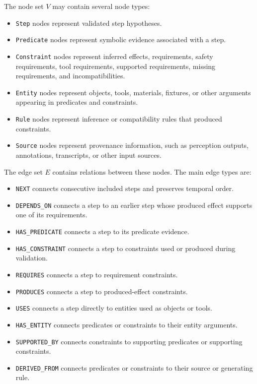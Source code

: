 The node set $V$ may contain several node types:

\begin{itemize}
    \item \texttt{Step} nodes represent validated step hypotheses.
    \item \texttt{Predicate} nodes represent symbolic evidence associated with a step.
    \item \texttt{Constraint} nodes represent inferred effects, requirements, safety requirements, tool requirements, supported requirements, missing requirements, and incompatibilities.
    \item \texttt{Entity} nodes represent objects, tools, materials, fixtures, or other arguments appearing in predicates and constraints.
    \item \texttt{Rule} nodes represent inference or compatibility rules that produced constraints.
    \item \texttt{Source} nodes represent provenance information, such as perception outputs, annotations, transcripts, or other input sources.
\end{itemize}

The edge set $E$ contains relations between these nodes. The main edge types are:

\begin{itemize}
    \item \texttt{NEXT} connects consecutive included steps and preserves temporal order.
    \item \texttt{DEPENDS\_ON} connects a step to an earlier step whose produced effect supports one of its requirements.
    \item \texttt{HAS\_PREDICATE} connects a step to its predicate evidence.
    \item \texttt{HAS\_CONSTRAINT} connects a step to constraints used or produced during validation.
    \item \texttt{REQUIRES} connects a step to requirement constraints.
    \item \texttt{PRODUCES} connects a step to produced-effect constraints.
    \item \texttt{USES} connects a step directly to entities used as objects or tools.
    \item \texttt{HAS\_ENTITY} connects predicates or constraints to their entity arguments.
    \item \texttt{SUPPORTED\_BY} connects constraints to supporting predicates or supporting constraints.
    \item \texttt{DERIVED\_FROM} connects predicates or constraints to their source or generating rule.
\end{itemize}

